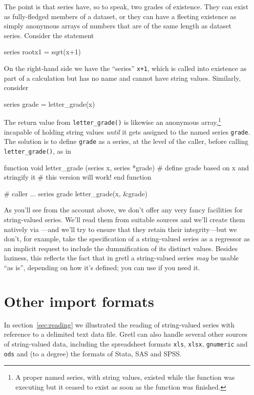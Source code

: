 The point is that series have, so to speak, two grades of
existence. They can exist as fully-fledged members of a dataset, or
they can have a fleeting existence as simply anonymous arrays of
numbers that are of the same length as dataset series. Consider the
statement
\begin{code}
series rootx1 = sqrt(x+1)
\end{code}
On the right-hand side we have the ``series'' \texttt{x+1}, which is
called into existence as part of a calculation but has no name and
cannot have string values. Similarly, consider
\begin{code}
series grade = letter_grade(x)
\end{code}
The return value from \verb|letter_grade()| is likewise an anonymous
array,\footnote{A proper named series, with string values, existed
  while the function was executing but it ceased to exist as soon as
  the function was finished.} incapable of holding string values
\textit{until} it gets assigned to the named series
\texttt{grade}. The solution is to define \texttt{grade} as a series,
at the level of the caller, before calling \verb|letter_grade()|, as
in
%
\begin{code}
function void letter_grade (series x, series *grade)
  # define grade based on x and stringify it
  # this version will work!
end function

# caller
...
series grade
letter_grade(x, &grade)
\end{code}

As you'll see from the account above, we don't offer any very fancy
facilities for string-valued series. We'll read them from suitable
sources and we'll create them natively via ---and
we'll try to ensure that they retain their integrity---but we don't,
for example, take the specification of a string-valued series as a
regressor as an implicit request to include the dummification of its
distinct values. Besides laziness, this reflects the fact that in
gretl a string-valued series \textit{may} be usable ``as is'',
depending on how it's defined; you can use  if you
need it.

\section{Other import formats}
\label{sec:other-imports}

In section~\ref{sec:reading} we illustrated the reading of
string-valued series with reference to a delimited text data
file. Gretl can also handle several other sources of string-valued
data, including the spreadsheet formats \texttt{xls}, \texttt{xlsx},
\texttt{gnumeric} and \texttt{ods} and (to a degree) the formats of
\textsf{Stata}, \textsf{SAS} and \textsf{SPSS}.

